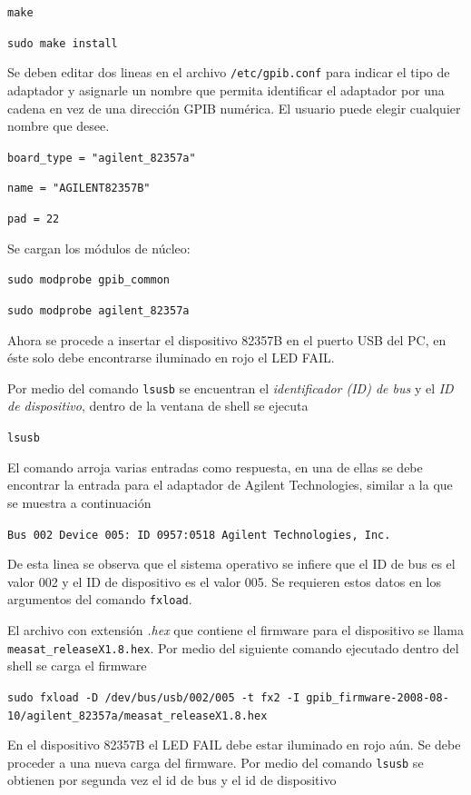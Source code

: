 \documentclass[paper=letter,oneside,fontsize=11pt]{article}
\begin{document}
		\texttt{make}
		
		\texttt{sudo make install}
		
		Se deben editar dos lineas en el archivo \texttt{/etc/gpib.conf} para indicar el tipo de adaptador y asignarle un nombre que permita identificar el adaptador por una cadena en vez de una dirección GPIB numérica. El usuario puede elegir cualquier nombre que desee.
		
		\texttt{board\_type = "agilent\_82357a"}
		
		\texttt{name = "AGILENT82357B"}
		
		\texttt{pad = 22}
		
		Se cargan los módulos de núcleo:
		
		\texttt{sudo modprobe gpib\_common}
		
		\texttt{sudo modprobe agilent\_82357a}
		
		Ahora se procede a insertar el dispositivo 82357B en el puerto USB del PC, en éste solo debe encontrarse iluminado en rojo el LED FAIL. 
		
		Por medio del comando \texttt{lsusb} se encuentran el \emph{identificador (ID) de bus} y el \emph{ID de dispositivo}, dentro de la ventana de shell se ejecuta
		
		\texttt{lsusb}
		
		El comando arroja varias entradas como respuesta, en una de ellas se debe encontrar la entrada para el adaptador de Agilent Technologies, similar a la que se muestra a continuación
	
		\texttt{Bus 002 Device 005: ID 0957:0518 Agilent Technologies, Inc.}
		
		De esta linea se observa que el sistema operativo se infiere que el ID de bus es el valor 002 y el ID de dispositivo es el valor 005. Se requieren estos datos en los argumentos del comando \texttt{fxload}.
		
		El archivo con extensión \emph{.hex} que contiene el firmware para el dispositivo se llama \texttt{measat\_releaseX1.8.hex}. Por medio del siguiente comando ejecutado dentro del shell se carga el firmware
		
		\texttt{sudo fxload -D /dev/bus/usb/002/005  -t fx2 -I gpib\_firmware-2008-08-10/agilent\_82357a/measat\_releaseX1.8.hex}
		
		En el dispositivo 82357B el LED FAIL debe estar iluminado en rojo aún. Se debe proceder a una nueva carga del firmware. Por medio del comando \texttt{lsusb} se obtienen por segunda vez el id de bus y el id de dispositivo
		
\end{document}
